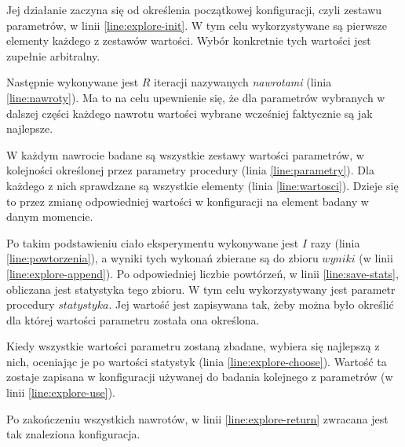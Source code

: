 \documentclass[./FM_mgr.tex]{subfiles}
\begin{document}
Jej działanie zaczyna się od określenia początkowej konfiguracji, czyli zestawu parametrów, w linii \ref{line:explore-init}. 
W tym celu wykorzystywane są pierwsze elementy każdego z zestawów wartości.
Wybór konkretnie tych wartości jest zupełnie arbitralny.

Następnie wykonywane jest $R$ iteracji nazywanych \emph{nawrotami} (linia \ref{line:nawroty}).
Ma to na celu upewnienie się, że dla parametrów wybranych w dalszej części każdego nawrotu wartości wybrane wcześniej faktycznie są jak najlepsze.

W każdym nawrocie badane są wszystkie zestawy wartości parametrów, w kolejności określonej przez parametry procedury (linia \ref{line:parametry}).
Dla każdego z nich sprawdzane są wszystkie elementy (linia \ref{line:wartosci}).
Dzieje się to przez zmianę odpowiedniej wartości w konfiguracji na element badany w danym momencie.

Po takim podstawieniu ciało eksperymentu wykonywane jest $I$ razy (linia \ref{line:powtorzenia}), a wyniki tych wykonań zbierane są do zbioru $wyniki$ (w linii \ref{line:explore-append}).
Po odpowiedniej liczbie powtórzeń, w linii \ref{line:save-stats}, obliczana jest statystyka tego zbioru.
W tym celu wykorzystywany jest parametr procedury $statystyka$.
Jej wartość jest zapisywana tak, żeby można było określić dla której wartości parametru została ona określona.

Kiedy wszystkie wartości parametru zostaną zbadane, wybiera się najlepszą z nich, oceniając je po wartości statystyk (linia \ref{line:explore-choose}).
Wartość ta zostaje zapisana w konfiguracji używanej do badania kolejnego z parametrów (w linii \ref{line:explore-use}).

Po zakończeniu wszystkich nawrotów, w linii \ref{line:explore-return} zwracana jest tak znaleziona konfiguracja.
\end{document}
